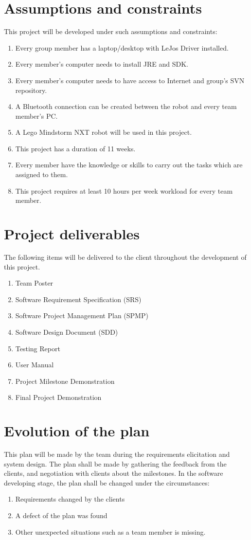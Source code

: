 \documentclass[11pt, a4paper]{report}
\begin{document}
\section{Assumptions and constraints}
This project will be developed under such assumptions and constraints:
\begin{enumerate}
	\item Every group member has a laptop/desktop with LeJos Driver installed.
	\item Every member's computer needs to install JRE and SDK.
	\item Every member's computer needs to have access to Internet and group's SVN repository.
	\item A Bluetooth connection can be created between the robot and every team member's PC.
	\item A Lego Mindstorm NXT robot will be used in this project. 
	\item This project has a duration of 11 weeks.
	\item Every member have the knowledge or skills to carry out the tasks which
are assigned to them.
	\item This project requires at least 10 hours per week workload for every team member.
\end{enumerate}

\section{Project deliverables}
The following items will be delivered to the client throughout the development of this project.
\begin{enumerate}
	\item Team Poster
	\item Software Requirement Specification (SRS)
	\item Software Project Management Plan (SPMP)
	\item Software Design Document (SDD)
	\item Testing Report
	\item User Manual
	\item Project Milestone Demonstration
	\item Final Project Demonstration
\end{enumerate}


\section{Evolution of the plan}
This plan will be made by the team during the requirements elicitation and system design. The plan shall be made by gathering the feedback from the clients, and negotiation with clients about the milestones. In the software developing stage, the plan shall be changed under the circumstances:
\begin{enumerate}
	\item Requirements changed by the clients
	\item A defect of the plan was found
	\item Other unexpected situations such as a team member is missing.
\end{enumerate}
\end{document}

